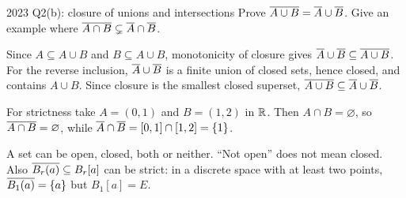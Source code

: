 \begin{exam}{2023 Q2(b): closure of unions and intersections}
Prove $\overline{A\cup B}=\overline{A}\cup\overline{B}$. Give an example where $\overline{A\cap B}\subsetneq\overline{A}\cap\overline{B}$.
\end{exam}
\begin{answer}
Since $A\subseteq A\cup B$ and $B\subseteq A\cup B$, monotonicity of closure gives $\overline{A}\cup\overline{B}\subseteq\overline{A\cup B}$. For the reverse inclusion, $\overline{A}\cup\overline{B}$ is a finite union of closed sets, hence closed, and contains $A\cup B$. Since closure is the smallest closed superset, $\overline{A\cup B}\subseteq\overline{A}\cup\overline{B}$.

For strictness take $A=(0,1)$ and $B=(1,2)$ in $\mathbb R$. Then $A\cap B=\varnothing$, so $\overline{A\cap B}=\varnothing$, while $\overline{A}\cap\overline{B}=[0,1]\cap[1,2]=\{1\}$.
\end{answer}
\begin{tip}
A set can be open, closed, both or neither. ``Not open'' does not mean closed. Also $\overline{B_r(a)}\subseteq B_r[a]$ can be strict: in a discrete space with at least two points, $\overline{B_1(a)}=\{a\}$ but $B_1[a]=E$.
\end{tip}



